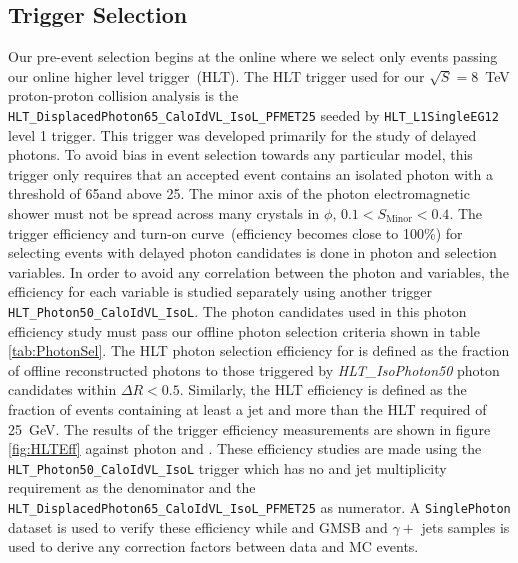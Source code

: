 \subsection{Trigger Selection}
Our pre-event selection begins at the online where we select only events passing our online higher level trigger~(HLT). The HLT trigger used for our $\sqrt{S} = 8$~TeV proton-proton collision analysis is the \texttt{HLT\_DisplacedPhoton65\_CaloIdVL\_IsoL\_PFMET25} 
seeded by \texttt{HLT\_L1SingleEG12} level 1 trigger. This trigger was developed primarily for the study of delayed photons. To avoid bias in event selection towards any particular model, this trigger only requires that an accepted event contains an isolated photon with a \pt threshold of 65\GeVc and \ETslash\hspace{0.15cm} above 25\GeV. The minor axis of the photon electromagnetic shower must not be spread across many crystals in $\phi$, $ 0.1 < S_{\mbox{Minor}} < 0.4$. The trigger efficiency and turn-on curve~(efficiency becomes close to 100\%) for selecting  events with delayed photon candidates is done in photon \pt and \ETslash\hspace{0.15cm} selection variables. In order to avoid any correlation between the photon and \ETslash\hspace{0.15cm} variables, the efficiency for each variable is studied separately using another trigger \texttt{HLT\_Photon50\_CaloIdVL\_IsoL}.  The photon candidates used in this photon efficiency study must pass our offline photon selection criteria shown in table \ref{tab:PhotonSel}. The HLT photon selection efficiency for \pt is defined as the fraction of offline reconstructed photons to those triggered by \textit{HLT\_IsoPhoton50} photon candidates within $\Delta R < 0.5$.
Similarly, the \ETslash\hspace{0.15cm} HLT efficiency is defined as the fraction of events containing at least a jet and \ETslash\hspace{0.15cm} more than the HLT required \ETslash\hspace{0.15cm} of 25~GeV.
The results of the trigger efficiency measurements are shown in figure \ref{fig:HLTEff} against photon \pt and \ETslash\hspace{0.15cm}. These efficiency studies are made using the \texttt{HLT\_Photon50\_CaloIdVL\_IsoL} trigger which has no \ETslash\hspace{0.15cm}and jet multiplicity requirement  as the denominator and the \texttt{HLT\_DisplacedPhoton65\_CaloIdVL\_IsoL\_PFMET25} as numerator. A \texttt{SinglePhoton} dataset is used to verify these efficiency while and GMSB and $\gamma +$ jets samples is used to derive any correction factors between data and MC events.

